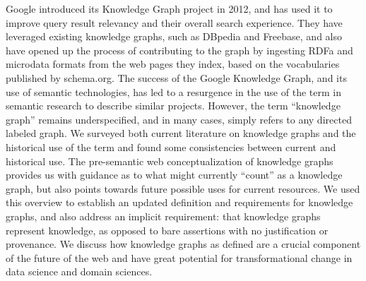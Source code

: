 Google introduced its Knowledge Graph project in 2012, and has used it to improve query result relevancy and their overall search experience.
They have leveraged existing knowledge graphs, such as DBpedia and Freebase, and also have opened up the process of contributing to the graph by ingesting RDFa and microdata formats from the web pages they index, based on the vocabularies published by schema.org.
The success of the Google Knowledge Graph, and its use of semantic technologies, has led to a resurgence in the use of the term in semantic research to describe similar projects.
However, the term ``knowledge graph'' remains underspecified, and in many cases, simply refers to any directed labeled graph.
We surveyed both current literature on knowledge graphs and the historical use of the term and found some consistencies between current and historical use.
The pre-semantic web conceptualization of knowledge graphs provides us with guidance as to what might currently ``count'' as a knowledge graph, but also points towards future possible uses for current resources.
We used this overview to establish an updated definition and requirements for knowledge graphs, and also address an implicit requirement: that knowledge graphs represent knowledge, as opposed to bare assertions with no justification or provenance.
We discuss how knowledge graphs as defined are a crucial component of the future of the web and have great potential for transformational change in data science and domain sciences.
